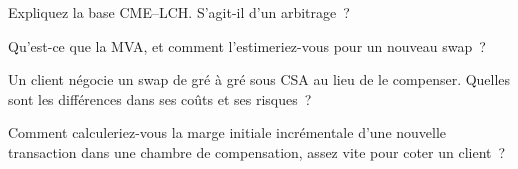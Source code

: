 \begin{interviewq}\label{iq:m2:swap-clearing-and-the-ccp-basis:3}
Expliquez la base CME--LCH. S'agit-il d'un arbitrage~?
\end{interviewq}

\begin{interviewq}\label{iq:m2:swap-clearing-and-the-ccp-basis:4}
Qu'est-ce que la MVA, et comment l'estimeriez-vous pour un nouveau swap~?
\end{interviewq}

\begin{interviewq}\label{iq:m2:swap-clearing-and-the-ccp-basis:5}
Un client négocie un swap de gré à gré sous CSA au lieu de le compenser. Quelles sont
les différences dans ses coûts et ses risques~?
\end{interviewq}

\begin{interviewq}\label{iq:m2:swap-clearing-and-the-ccp-basis:6}
Comment calculeriez-vous la marge initiale incrémentale d'une nouvelle transaction dans
une chambre de compensation, assez vite pour coter un client~?
\end{interviewq}

